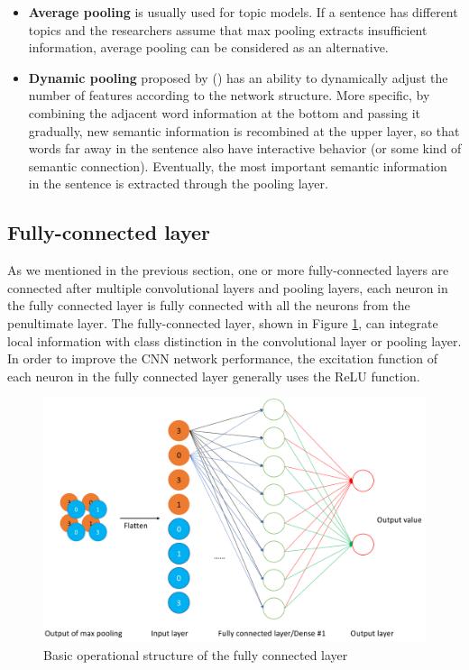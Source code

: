 \documentclass[]{krantz}
\begin{document}
\begin{itemize}
\item
  \textbf{Average pooling} is usually used for topic models. If a sentence has different topics and the researchers assume that max pooling extracts insufficient information, average pooling can be considered as an alternative.
\item
  \textbf{Dynamic pooling} proposed by (\citet{Kalchbrenner2014ACN}) has an ability to dynamically adjust the number of features according to the network structure. More specific, by combining the adjacent word information at the bottom and passing it gradually, new semantic information is recombined at the upper layer, so that words far away in the sentence also have interactive behavior (or some kind of semantic connection). Eventually, the most important semantic information in the sentence is extracted through the pooling layer.
\end{itemize}

\hypertarget{fully-connected-layer}{%
\subsection{Fully-connected layer}\label{fully-connected-layer}}

As we mentioned in the previous section, one or more fully-connected layers are connected after multiple convolutional layers and pooling layers, each neuron in the fully connected layer is fully connected with all the neurons from the penultimate layer. The fully-connected layer, shown in Figure \ref{fig:figs-6}, can integrate local information with class distinction in the convolutional layer or pooling layer. In order to improve the CNN network performance, the excitation function of each neuron in the fully connected layer generally uses the ReLU function.

\begin{figure}[ht]

{\centering \includegraphics[width=0.6\linewidth]{figures/01-03-cnns-and-their-applications-in-nlp/Fully_Connected} 

}

\caption{Basic operational structure of the fully connected layer}\label{fig:figs-6}
\end{figure}
\end{document}
